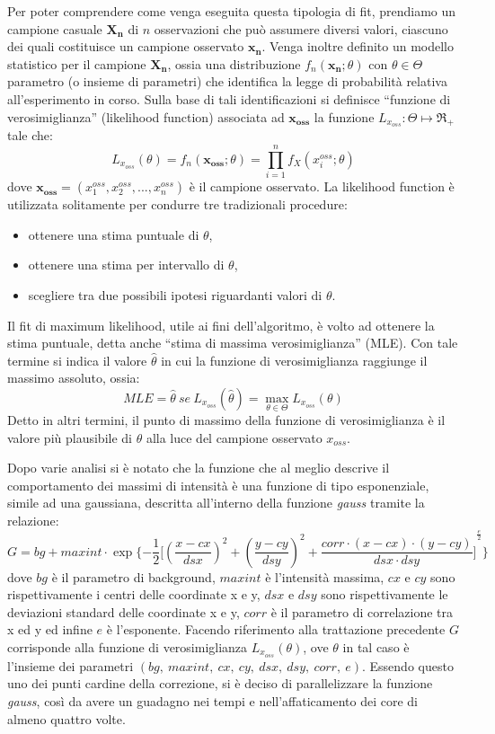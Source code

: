 Per poter comprendere come venga eseguita questa tipologia di fit, prendiamo un campione casuale $\mathbf{X_n}$ di $n$ osservazioni che può assumere diversi valori, ciascuno dei quali costituisce un campione osservato $\mathbf{x_n}$.
Venga inoltre definito un modello statistico per il campione $\mathbf{X_n}$, ossia una distribuzione $f_n (\mathbf{x_n};\theta)$ con $\theta \in \Theta$ parametro (o insieme di parametri) che identifica la legge di probabilità relativa all'esperimento in corso.
Sulla base di tali identificazioni si definisce ``funzione di verosimiglianza'' (likelihood function)
associata ad $\mathbf{x_{oss}}$ la funzione $L_{x_{oss}}: \Theta\longmapsto \Re_+$ tale che:
$$L_{x_{oss}}(\theta)=f_n (\mathbf{x_{oss}};\theta)=\prod_{i=1}^n f_X (x^{oss}_i;\theta) $$
dove $\mathbf{x_{oss}}=(x^{oss}_1, x^{oss}_2, ..., x^{oss}_n)$ è il campione osservato. 
La likelihood function è utilizzata solitamente per condurre tre tradizionali procedure:
\begin{itemize}
 \item ottenere una stima puntuale di $\theta$,
 \item ottenere una stima per intervallo di $\theta$,
 \item scegliere tra due possibili ipotesi riguardanti valori di $\theta$.
\end{itemize}
Il fit di maximum likelihood, utile ai fini dell'algoritmo, è volto ad ottenere la stima puntuale, detta anche ``stima di massima verosimiglianza'' (MLE). Con tale termine si indica il valore $\hat{\theta}$ in cui la funzione di verosimiglianza raggiunge il massimo assoluto, ossia:
$$MLE = \hat{\theta}\ se\ L_{x_{oss}}(\hat{\theta})=\max_{\theta \in \Theta} L_{x_{oss}}(\theta)$$
Detto in altri termini, il punto di massimo della funzione di verosimiglianza è il valore più plausibile di $\theta$ alla luce del campione osservato $x_{oss}$.

Dopo varie analisi si è notato che la funzione che al meglio descrive il comportamento dei massimi di intensità è una funzione di tipo esponenziale, simile ad una gaussiana, descritta all'interno della funzione \textit{gauss} tramite la relazione:
$$ G = bg + maxint \cdot \exp \{ {-\frac{1}{2} [{     (\frac{x-cx}{dsx})^2   +  (\frac{y-cy}{dsy})^2  +  \frac{corr \cdot (x-cx) \cdot (y-cy)}{dsx \cdot dsy} ]}^{\frac{e}{2}}}\} $$
dove $bg$ è il parametro di background, $maxint$ è l'intensità massima, $cx$ e $cy$ sono rispettivamente i centri delle coordinate x e y, $dsx$ e $dsy$ sono rispettivamente le deviazioni standard delle coordinate x e y, $corr$ è il parametro di correlazione tra x ed y ed infine $e$ è l'esponente.
Facendo riferimento alla trattazione precedente $G$ corrisponde alla funzione di verosimiglianza $L_{x_{oss}}(\theta)$, ove $\theta$ in tal caso è l'insieme dei parametri $(bg,\ maxint,\ cx,\ cy,\ dsx,\ dsy,\ corr,\ e)$.
Essendo questo uno dei punti cardine della correzione, si è deciso di parallelizzare la funzione \textit{gauss}, così da avere un guadagno nei tempi e nell'affaticamento dei core di almeno quattro volte.

